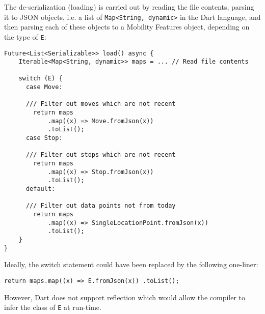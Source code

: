 The de-serialization (loading) is carried out by reading the file contents, parsing it to JSON objects, i.e. a list of \verb|Map<String, dynamic>| in the Dart language, and then parsing each of these objects to a Mobility Features object, depending on the type of \verb|E|:
\begin{verbatim}
Future<List<Serializable>> load() async {
    Iterable<Map<String, dynamic>> maps = ... // Read file contents
    
    switch (E) {
      case Move:
    
      /// Filter out moves which are not recent
        return maps
            .map((x) => Move.fromJson(x))
            .toList();
      case Stop:
    
      /// Filter out stops which are not recent
        return maps
            .map((x) => Stop.fromJson(x))
            .toList();
      default:
    
      /// Filter out data points not from today
        return maps
            .map((x) => SingleLocationPoint.fromJson(x))
            .toList();
    }
}
\end{verbatim}
Ideally, the switch statement could have been replaced by the following one-liner:
\begin{verbatim}
return maps.map((x) => E.fromJson(x)) .toList();
\end{verbatim}
However, Dart does not support reflection which would allow the compiler to infer the class of \verb|E| at run-time.
